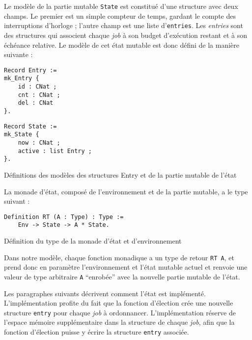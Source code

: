	Le modèle de la partie mutable \texttt{State} est constitué d'une structure avec deux champs. Le premier est un simple compteur de temps, gardant le compte des interruptions d'horloge ; l'autre champ est une liste d'\texttt{entries}. Les \emph{entries} sont des structures qui associent chaque \emph{job} à son budget d'exécution restant et à son échéance relative. Le modèle de cet état mutable est donc défini de la manière suivante :
\begin{listing}[ht]
\begin{minipage}[c]{0.50\linewidth}
\begin{verbatim}
Record Entry :=
mk_Entry {
    id : CNat ;
    cnt : CNat ;
    del : CNat
}.
\end{verbatim}
\end{minipage}
\begin{minipage}[c]{0.50\linewidth}
\begin{verbatim}
Record State :=                     
mk_State {                      
    now : CNat ;                 
    active : list Entry ;
}.

\end{verbatim}
\end{minipage}
\caption{Définitions des modèles des structures Entry et de la partie mutable de l'état}
\label{code:entry_state_definition}
\end{listing}

	La monade d'état, composé de l'environnement et de la partie mutable, a le type suivant :

\begin{listing}[!ht]
	\begin{verbatim}
Definition RT (A : Type) : Type :=
    Env -> State -> A * State.
	\end{verbatim}
	\caption{Définition du type de la monade d'état et d'environnement}
	\label{code:monad_type}
\end{listing}

	Dans notre modèle, chaque fonction monadique a un type de retour \texttt{RT A}, et prend donc en paramètre l'environnement et l'état mutable actuel et renvoie une valeur de type arbitraire \texttt{A} ``enrobée'' avec la nouvelle partie mutable de l'état.

	Les paragraphes suivants décrivent comment l'état est implémenté.
	L'implémentation profite du fait que la fonction d'élection crée une nouvelle structure \texttt{entry} pour chaque \emph{job} à ordonnancer. L'implémentation réserve de l'espace mémoire supplémentaire dans la structure de chaque \emph{job}, afin que la fonction d'élection puisse y écrire la structure \texttt{entry} associée.


